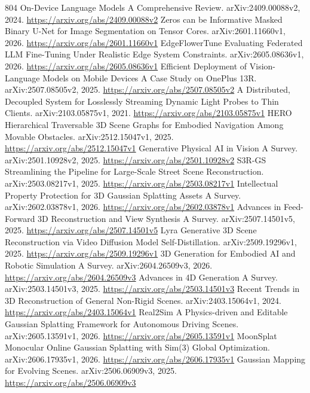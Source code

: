 \documentclass[11pt]{article}
\begin{document}
\begin{thebibliography}{804}
 On-Device Language Models A Comprehensive Review. arXiv:2409.00088v2, 2024. \url{https://arxiv.org/abs/2409.00088v2}
 Zeros can be Informative Masked Binary U-Net for Image Segmentation on Tensor Cores. arXiv:2601.11660v1, 2026. \url{https://arxiv.org/abs/2601.11660v1}
 EdgeFlowerTune Evaluating Federated LLM Fine-Tuning Under Realistic Edge System Constraints. arXiv:2605.08636v1, 2026. \url{https://arxiv.org/abs/2605.08636v1}
 Efficient Deployment of Vision-Language Models on Mobile Devices A Case Study on OnePlus 13R. arXiv:2507.08505v2, 2025. \url{https://arxiv.org/abs/2507.08505v2}
 A Distributed, Decoupled System for Losslessly Streaming Dynamic Light Probes to Thin Clients. arXiv:2103.05875v1, 2021. \url{https://arxiv.org/abs/2103.05875v1}
 HERO Hierarchical Traversable 3D Scene Graphs for Embodied Navigation Among Movable Obstacles. arXiv:2512.15047v1, 2025. \url{https://arxiv.org/abs/2512.15047v1}
 Generative Physical AI in Vision A Survey. arXiv:2501.10928v2, 2025. \url{https://arxiv.org/abs/2501.10928v2}
 S3R-GS Streamlining the Pipeline for Large-Scale Street Scene Reconstruction. arXiv:2503.08217v1, 2025. \url{https://arxiv.org/abs/2503.08217v1}
 Intellectual Property Protection for 3D Gaussian Splatting Assets A Survey. arXiv:2602.03878v1, 2026. \url{https://arxiv.org/abs/2602.03878v1}
 Advances in Feed-Forward 3D Reconstruction and View Synthesis A Survey. arXiv:2507.14501v5, 2025. \url{https://arxiv.org/abs/2507.14501v5}
 Lyra Generative 3D Scene Reconstruction via Video Diffusion Model Self-Distillation. arXiv:2509.19296v1, 2025. \url{https://arxiv.org/abs/2509.19296v1}
 3D Generation for Embodied AI and Robotic Simulation A Survey. arXiv:2604.26509v3, 2026. \url{https://arxiv.org/abs/2604.26509v3}
 Advances in 4D Generation A Survey. arXiv:2503.14501v3, 2025. \url{https://arxiv.org/abs/2503.14501v3}
 Recent Trends in 3D Reconstruction of General Non-Rigid Scenes. arXiv:2403.15064v1, 2024. \url{https://arxiv.org/abs/2403.15064v1}
 Real2Sim A Physics-driven and Editable Gaussian Splatting Framework for Autonomous Driving Scenes. arXiv:2605.13591v1, 2026. \url{https://arxiv.org/abs/2605.13591v1}
 MoonSplat Monocular Online Gaussian Splatting with Sim(3) Global Optimization. arXiv:2606.17935v1, 2026. \url{https://arxiv.org/abs/2606.17935v1}
 Gaussian Mapping for Evolving Scenes. arXiv:2506.06909v3, 2025. \url{https://arxiv.org/abs/2506.06909v3}

\end{thebibliography}
\end{document}
